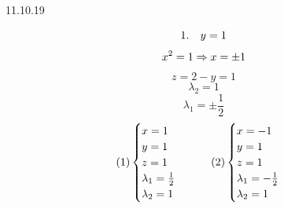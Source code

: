 \documentclass[matan.tex]{subfiles}
\begin{document}
\begin{lect} {11.10.19}
\begin{Task}[3]
            \[1. \quad y = 1\]
            \[x^2 = 1 \Rightarrow x = \pm 1\]
            \[z = 2 - y = 1\]
            \[\lambda_2 = 1\]
            \[\lambda_1 = \pm \frac{1}{2}\]
            \[(1) \begin{cases}
                x = 1\\
                y = 1\\
                z = 1\\
                \lambda_1 = \frac{1}{2}\\
                \lambda_2 = 1
            \end{cases} \qquad (2) \begin{cases}
                x = -1\\
                y = 1\\
                z = 1\\
                \lambda_1 = -\frac{1}{2}\\
                \lambda_2 = 1
            \end{cases}\]


\end{Task}
\end{lect}
\end{document}
